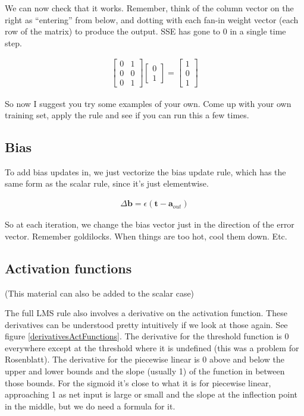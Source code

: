 We can now check that it works. Remember, think of the column vector on the right as ``entering'' from below, and dotting with each fan-in weight vector (each row of the matrix) to produce the output.  SSE has gone to 0 in a single time step.

\begin{align*}
\begin{bmatrix} 0 & 1 \\ 0 & 0 \\  0  & 1  \end{bmatrix}
\begin{bmatrix} 0 \\ 1 \end{bmatrix}
= \begin{bmatrix} 1 \\ 0 \\ 1  \end{bmatrix}
\end{align*}

So now I suggest you try some examples of your own.  Come up with your own training set, apply the rule and see if you can run this a few times.  

\subsection{Bias}

To add bias updates in, we just vectorize the bias update rule, which has the same form as the scalar rule, since it's just elementwise.

\begin{eqnarray*}
\Delta \mathbf{b}  =  \epsilon (\mathbf{t} - \mathbf{a}_{out})
\end{eqnarray*}

So at each iteration, we change the bias vector just in the direction of the error vector. Remember goldilocks.  When things are too hot, cool them down. Etc.

\subsection{Activation functions}

(This material can also be added to the scalar case)


The full LMS rule also involves a derivative on the activation function.  These derivatives can be understood pretty intuitively if we look at those again. See figure \ref{derivativesActFunctions}.  The derivative for the threshold function is 0 everywhere except at the threshold where it is undefined (this was a problem for Rosenblatt). The derivative for the piecewise linear is 0 above and below the upper and lower bounds and the slope (usually 1) of the function in between those bounds. For the sigmoid it's close to what it is for piecewise linear, approaching 1 as net input is large or small and the slope at the inflection point in the middle, but we do need a formula for it.

